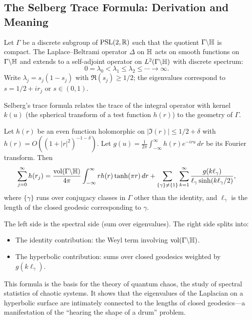 \subsection{The Selberg Trace Formula: Derivation and Meaning}

Let \(\Gamma\) be a discrete subgroup of \(\operatorname{PSL}(2,\mathbb{R})\) such that the quotient \(\Gamma \backslash \mathbb{H}\) is compact. The Laplace--Beltrami operator \(\Delta\) on \(\mathbb{H}\) acts on smooth functions on \(\Gamma \backslash \mathbb{H}\) and extends to a self-adjoint operator on \(L^2(\Gamma \backslash \mathbb{H})\) with discrete spectrum:
\[
0 = \lambda_0 < \lambda_1 \leq \lambda_2 \leq \cdots \to \infty.
\]
Write \(\lambda_j = s_j(1 - s_j)\) with \(\Re(s_j) \geq 1/2\); the eigenvalues correspond to \(s = 1/2 + i r_j\) or \(s \in (0,1)\).

Selberg's trace formula relates the trace of the integral operator with kernel \(k(u)\) (the spherical transform of a test function \(h(r)\)) to the geometry of \(\Gamma\).

\begin{theorem}
Let \(h(r)\) be an even function holomorphic on \(|\Im(r)| \leq 1/2 + \delta\) with \(h(r) = O((1+|r|^2)^{-1-\delta})\). Let \(g(u) = \frac{1}{2\pi} \int_{-\infty}^{\infty} h(r) e^{-iru}\, dr\) be its Fourier transform. Then
\[
\sum_{j=0}^{\infty} h(r_j) = \frac{\operatorname{vol}(\Gamma \backslash \mathbb{H})}{4\pi} \int_{-\infty}^{\infty} r h(r) \tanh(\pi r)\, dr + \sum_{\{\gamma\} \neq \{1\}} \sum_{k=1}^{\infty} \frac{g(k \ell_\gamma)}{\ell_\gamma \sinh(k \ell_\gamma/2)},
\]
where \(\{\gamma\}\) runs over conjugacy classes in \(\Gamma\) other than the identity, and \(\ell_\gamma\) is the length of the closed geodesic corresponding to \(\gamma\).
\end{theorem}

The left side is the spectral side (sum over eigenvalues). The right side splits into:
\begin{itemize}
    \item The identity contribution: the Weyl term involving \(\operatorname{vol}(\Gamma \backslash \mathbb{H})\).
    \item The hyperbolic contribution: sums over closed geodesics weighted by \(g(k \ell_\gamma)\).
\end{itemize}

This formula is the basis for the theory of quantum chaos, the study of spectral statistics of chaotic systems. It shows that the eigenvalues of the Laplacian on a hyperbolic surface are intimately connected to the lengths of closed geodesics---a manifestation of the ``hearing the shape of a drum'' problem.

